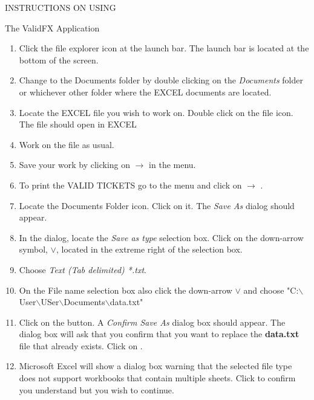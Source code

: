 \documentclass[12pt]{article}
\begin{document}
\fontsize{12}{16}
\selectfont

\centerline{\large INSTRUCTIONS ON USING}
\centerline{\large The ValidFX Application}

\vspace{0.2 in}

\begin{enumerate}
\item  Click the file explorer icon at the launch bar. The launch bar is located at the bottom
 of the screen. 

\item  Change to the Documents folder by double clicking on the {\sl Documents} folder
  or whichever other folder where the EXCEL documents are located.

\item  Locate the EXCEL file you wish to work on. Double click on the file icon. The file should open in
EXCEL

\item  Work on the file as usual.

\item  Save your work by clicking on   $\longrightarrow$  in the menu.

\item  To print the VALID TICKETS go to the menu and click 
on   $\longrightarrow$ .

\item  Locate the Documents Folder icon. Click on it. The {\sl Save As} dialog should appear.

\item  In the dialog, locate the {\sl Save as type} selection box. 
Click on the down-arrow symbol, $\vee$,
  located in the extreme right of the selection box.

\item  Choose {\sl Text (Tab delimited) *.txt}.

\item  On the File name selection box also click the down-arrow $\vee$ and choose\hfill\break 
       "C:$\backslash$User$\backslash$USer$\backslash$Documents$\backslash$data.txt"

\item  Click on the  button. A {\sl Confirm Save As} dialog box should appear. 
The dialog box will 
  ask that you confirm that you want to replace the {\bf data.txt}
  file that already exists. Click on .

\item  Microsoft Excel will show a dialog box warning that the 
selected file type does not support workbooks
that contain multiple sheets. Click  to confirm you understand but you wish to continue.


\end{enumerate}
\end{document}
